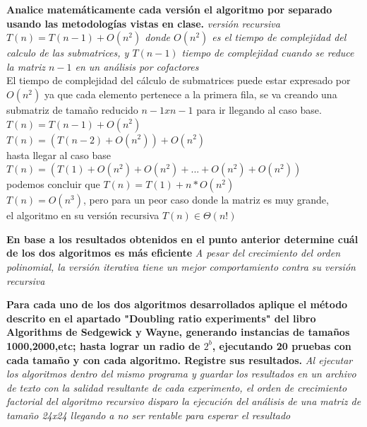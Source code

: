 \documentclass{article}
\begin{document}
\begin{question}
  \textbf{Analice matemáticamente cada versión el algoritmo por separado usando las metodologías vistas en clase.}
  \textit{versión recursiva $T(n) = T(n-1) + O(n^{2})$ donde $O(n^{2})$ es el tiempo de complejidad del calculo de las submatrices, y $T(n-1)$ tiempo de complejidad cuando se reduce la matriz $n-1$ en un análisis por cofactores}\\
  El tiempo de complejidad del cálculo de submatrices puede estar expresado por $O(n^{2})$ ya que cada elemento pertenece a la primera fila, se va creando una submatriz de tamaño reducido $n-1 x n-1$ para ir llegando al caso base.\\
  $T(n) = T(n-1)+O(n^{2})$\\
  $T(n) = (T(n-2)+ O(n^{2}))+O(n^{2})$\\
  hasta llegar al caso base\\
  $T(n) = (T(1) + O(n^{2})+O(n^{2})+...+O(n^{2})+O(n^{2}))$\\
  podemos concluir que $T(n) = T(1) + n*O(n^{2})$\\
  $T(n) = O(n^{3})$, pero para un peor caso donde la matriz es muy grande, \\el algoritmo en su versión recursiva $T(n) \in \Theta(n!)$

  

\end{question}

\begin{question}
  \textbf{En base a los resultados obtenidos en el punto anterior determine cuál de los dos algoritmos es más eficiente}
  \textit{A pesar del crecimiento del orden polinomial, la versión iterativa tiene un mejor comportamiento contra su versión recursiva}
\end{question}

\begin{question}
  \textbf{Para cada uno de los dos algoritmos desarrollados aplique el método descrito en el apartado "Doubling ratio experiments" del libro Algorithms de Sedgewick y Wayne, generando instancias de tamaños 1000,2000,etc; hasta lograr un radio de $2^{b}$, ejecutando 20 pruebas con cada tamaño y con cada algoritmo. Registre sus resultados.}
  \textit{Al ejecutar los algoritmos dentro del mismo programa y guardar los resultados en un archivo de texto con la salidad resultante de cada experimento, el orden de crecimiento factorial del algoritmo recursivo disparo la ejecución del análisis de una matriz de tamaño 24x24 llegando a no ser rentable para esperar el resultado}
\end{question}
\end{document}
